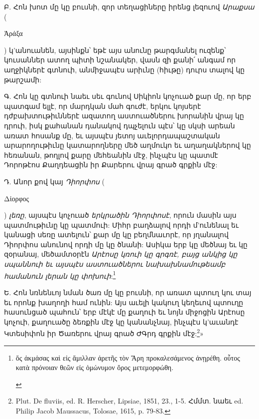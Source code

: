 \documentclass{article}
\begin{document}
{Բ. Հոն խոտ մը կը բուսնի, զոր տեղացիները իրենց լեզուով \emph{Արաքսա} (\begin{greek}Ἀράξα\end{greek}) կ'անուանեն, այսինքն՝ եթէ այս անունը թարգմանել ուզենք՝ կուսաններ ատող պիտի նշանակեր, վասն զի քանի՛ անգամ որ աղջիկներէ գտնուի, անմիջապէս արիւնը (հիւթը) դուրս տալով կը թարշամի:

Գ. Հոն կը գտնուի նաեւ սեւ գունով Սիկիոն կոչուած քար մը, որ երբ պատգամ ելլէ, որ մարդկան մահ գուժէ, երկու կոյսերէ դժբախտութիւններէ ազատող աստուածներու խորանին վրայ կը դրուի, իսկ քահանան դանակով դպչելուն պէս՝ կը սկսի արեան առատ հոսանք մը, եւ այսպէս յետոյ աւելորդապաշտական արարողութիւնը կատարողները մեծ աղմուկո եւ աղաղակներով կը հեռանան, թողլով քարը մեհեանին մէջ, ինչպէս կը պատմէ Դորոթէոս Քաղդեացին իր Քարերու վրայ գրած գրքին մէջ:

Դ. Անոր քով կայ \emph{Դիորփոս} (\begin{greek}Δἰορφος\end{greek}) \emph{լեռը}, այսպէս կոչուած \emph{երկրածին Դիորփոսէ}, որուն մասին այս պատմութիւնը կը պատմուի: Միհր բաղձալով որդի մ'ունենալ եւ կանացի սեռը ատելուն՝ քար մը կը բեղմնաւորէ, որ յղանալով Դիորփոս անունով որդի մը կը ծնանի: Ասիկա երբ կը մեծնայ եւ կը զօրանայ, մեծամտօրէն \emph{Արէոսը կռուի կը գրգռէ, բայց անկից կը սպաննուի եւ այսպէս աստուածներու նախախնամութեամբ համանուն լերան կը փոխուի}:\footnote{\begin{greek}ὅς ἀκμἀσας καὶ εἰς ἅμιλλαν ἀρετῆς τὸν Ἄρη προκαλεσάμενος ἀνῃρέθη. οὗτος κατὰ πρόνοιαν θεῶν εἰς ὁμώνυμον ὄρος μετεμορφώθη.\end{greek}}

Ե. Հոն նռնենւոյ նման ծառ մը կը բուսնի, որ առատ պտուղ կու տայ եւ որոնք խաղողի համ ունին: Այս աւելի կակուղ կեղեւով պտուղը հասունցած պահուն՝ երբ մէկէ մը քաղուի եւ նոյն միջոցին Արէոսը կոչուի, քաղուածը ձեռքին մէջ կը կանանչնայ, ինչպէս կ'աւանդէ Կտեսիփոն իր Ծառերու վրայ գրած ԺԳրդ գրքին մէջ:\footnote{Plut. De fluviis, ed. R. Herscher, Lipsiae, 1851, 23., 1-5. Հմմտ. նաեւ ed. Philip Jacob Maussacus, Tolosae, 1615, p. 79-83.}»

}
\end{document}
